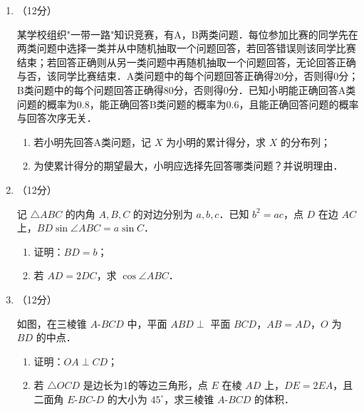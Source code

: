 \begin{description}
\begin{enumerate}[leftmargin=5pt]
        已知数列 $\{a_{n}\}$ 满足 $a_{1}=1$，$a_{n+1}=\begin{cases}a_{n}+1,&n\text{为奇数},\\ a_{n}+2,&n\text{为偶数}.\end{cases}$

        \begin{enumerate}[label=(\arabic*)]
            \item 记 $b_{n}=a_{2n}$，写出 $b_{1},b_{2}$，并求数列 $\{b_{n}\}$ 的通项公式；
            \item 求 $\{a_{n}\}$ 的前20项和．
        \end{enumerate}

        \item （12分）

        某学校组织"一带一路"知识竞赛，有A，B两类问题．每位参加比赛的同学先在两类问题中选择一类并从中随机抽取一个问题回答，若回答错误则该同学比赛结束；若回答正确则从另一类问题中再随机抽取一个问题回答，无论回答正确与否，该同学比赛结束．A类问题中的每个问题回答正确得20分，否则得0分；B类问题中的每个问题回答正确得80分，否则得0分．已知小明能正确回答A类问题的概率为0.8，能正确回答B类问题的概率为0.6，且能正确回答问题的概率与回答次序无关．

        \begin{enumerate}[label=(\arabic*)]
            \item 若小明先回答A类问题，记 $X$ 为小明的累计得分，求 $X$ 的分布列；
            \item 为使累计得分的期望最大，小明应选择先回答哪类问题？并说明理由．
        \end{enumerate}

        \item （12分）

        记 $\triangle ABC$ 的内角 $A,B,C$ 的对边分别为 $a,b,c$．已知 $b^{2}=ac$，点 $D$ 在边 $AC$ 上，$BD\sin\angle ABC=a\sin C$．

        \begin{enumerate}[label=(\arabic*)]
            \item 证明：$BD=b$；
            \item 若 $AD=2DC$，求 $\cos\angle ABC$．
        \end{enumerate}

        \item （12分）

        如图，在三棱锥 $A$-$BCD$ 中，平面 $ABD\perp$ 平面 $BCD$，$AB=AD$，$O$ 为 $BD$ 的中点．

        \begin{enumerate}[label=(\arabic*)]
            \item 证明：$OA\perp CD$；
            \item 若 $\triangle OCD$ 是边长为1的等边三角形，点 $E$ 在棱 $AD$ 上，$DE=2EA$，且二面角 $E$-$BC$-$D$ 的大小为 $45^{\circ}$，求三棱锥 $A$-$BCD$ 的体积．
        \end{enumerate}


\end{enumerate}
\end{description}
